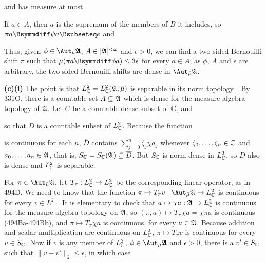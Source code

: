 {

\noindent and has measure at most


\noindent If $a\in A$, then $a$ is the supremum of the members of $B$ it
includes, so $\pi a\Bsymmdiff\psi a\Bsubseteq e$ and


\medskip

 Thus, given $\phi\in\AmuA$, $A\in[\frak A]^{<\omega}$
and $\epsilon>0$, we can find a two-sided Bernouilli shift $\pi$ such that
$\bar\mu(\pi a\Bsymmdiff\phi a)\le 3\epsilon$ for every $a\in A$;  as
$\phi$, $A$ and $\epsilon$ are arbitrary, the two-sided Bernouilli shifts
are dense in $\AmuA$.

\medskip

{\bf (c)(i)} The point is that
$L^2_{\Bbb C}=L^2_{\Bbb C}(\frak A,\bar\mu)$ is separable in its norm
topology.   \Prf\ By 331O, there is a countable set
$A\subseteq\frak A$ which is dense for the measure-algebra topology of
$\frak A$.   Let $C$ be a countable dense subset of $\Bbb C$, and


\noindent so that $D$ is a countable subset of $L^2_{\Bbb C}$.
Because the function


\noindent is continuous for each $n$, $\overline{D}$ contains
$\sum_{j=0}^n\zeta_j\chi a_j$ whenever
$\zeta_0,\ldots,\zeta_n\in\Bbb C$ and $a_0,\ldots,a_n\in\frak A$,
that is, $S_{\Bbb C}=S_{\Bbb C}(\frak A)\subseteq\overline{D}$.   But
$S_{\Bbb C}$ is norm-dense in $L^2_{\Bbb C}$, so
$D$ also is dense and $L^2_{\Bbb C}$ is separable.\ \Qed

\medskip

 For $\pi\in\AmuA$, let
$T_{\pi}:L^2_{\Bbb C}\to L^2_{\Bbb C}$ be the corresponding linear
operator, as in 494D.   We need to know that the function
$\pi\mapsto T_{\pi}v:\AmuA\to L^2_{\Bbb C}$ is continuous for every
$v\in L^2$.   \Prf\ It is elementary to check that
$a\mapsto\chi a:\frak A\to L^2_{\Bbb C}$ is continuous for the
measure-algebra topology on $\frak A$, so
$(\pi,a)\mapsto T_{\pi}\chi a=\chi\pi a$ is continuous (494Ba-494Bb), and
$\pi\mapsto T_{\pi}\chi a$ is continuous, for every $a\in\frak A$.
Because addition and scalar multiplication are continuous on
$L^2_{\Bbb C}$, $\pi\mapsto T_{\pi}v$ is continuous for every
$v\in S_{\Bbb C}$.   Now if $v$ is any member of $L^2_{\Bbb C}$,
$\phi\in\AmuA$ and $\epsilon>0$, there is a $v'\in S_{\Bbb C}$ such that
$\|v-v'\|_2\le\epsilon$, in which case

}
